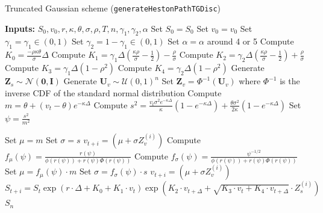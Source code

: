 \documentclass[11pt]{article}
\numberwithin{equation}{section}
\begin{document}
\newpage
\begin{algorithm}
\caption{Truncated Gaussian scheme (\texttt{generateHestonPathTGDisc})}
\begin{algorithmic}
\State \textbf{Inputs:} $S_0, v_0, r, \kappa, \theta, \sigma, \rho, T, n,\gamma_1,\gamma_2,\alpha$
\State Set $S_0 = S_0$
\State Set $v_0 = v_0$
\State Set $\gamma_1=\gamma_1\in (0,1)$
\State Set $\gamma_2=1-\gamma_1 \in (0,1)$
\State Set $\alpha=\alpha$ around 4 or 5
\State Compute $K_0 =  \frac{-\rho \kappa \theta}{\sigma} \Delta$
\State Compute $K_1 = \gamma_1 \Delta \left (\frac{\kappa \rho }{\sigma}-\frac{1}{2} \right)-\frac{\rho}{\sigma}$
\State Compute $K_2=\gamma_2\Delta \left ( \frac{\kappa \rho }{\sigma}-\frac{1}{2}\right )+\frac{\rho}{\sigma}$
\State Compute $K_3=\gamma_1\Delta (1-\rho^2)$
\State Compute $K_4=\gamma_2\Delta (1-\rho^2)$
\State Generate $\mathbf{Z}_s \sim \mathcal{N}(\mathbf{0}, \mathbf{I})$
\State Generate $\mathbf{U}_v \sim \mathcal{U}(0, 1)^n$
\State Set $\mathbf{Z}_v = \Phi^{-1}(\mathbf{U}_v)$ where $\Phi^{-1}$ is the inverse CDF of the standard normal distribution
\State Compute $m = \theta + (v_t - \theta)e^{-\kappa \Delta} $
\State Compute $s^2 = \frac{v_t\sigma^2 e^{-\kappa \Delta}}{\kappa}\left (1-e^{-\kappa \Delta}\right)+\frac{\theta \sigma ^2}{2\kappa}\left(1-e^{-\kappa \Delta}\right)$
\State Set $\psi = \frac{s^2}{m^2}$

\State Set $\mu=m$
\State Set $\sigma=s$
\vspace{0.1cm}
\State $v_{t+i}=\left(\mu+\sigma Z_v^{(i)} \right )$
\Else
\State Compute $f_\mu(\psi)=\frac{r(\psi)}{\phi(r(\psi))+r(\psi)\Phi(r(\psi))}$
\State Compute $f_\sigma(\psi)=\frac{\psi^{-1/2}}{\phi(r(\psi))+r(\psi)\Phi(r(\psi))}$
\State Set $\mu=f_\mu(\psi)\cdot m$
\State Set $\sigma=f_\sigma(\psi)\cdot s$
\vspace{0.1cm}
\State $v_{t+i}=\left(\mu+\sigma Z_v^{(i)} \right )$
\EndIf
\State $S_{t+i}=S_t \exp\left(r \cdot \Delta + K_0 + K_1 \cdot v_t  \right) \exp\left(K_2 \cdot v_{t+\Delta}+\sqrt{K_3 \cdot v_t + K_4 \cdot v_{t+\Delta}} \cdot Z_s^{(i)}\right)$
\EndFor
\State \Return $S_n$
\end{algorithmic}
\end{algorithm}
\end{document}
